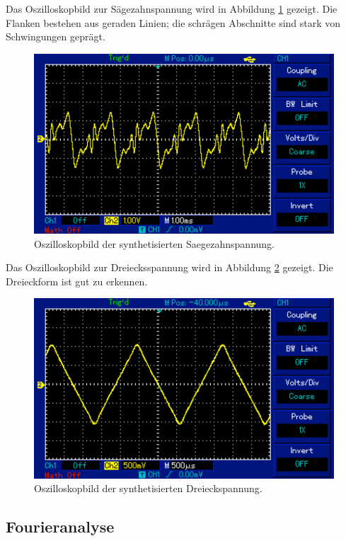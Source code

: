Das Oszilloskopbild zur Sägezahnspannung wird in Abbildung \ref{fig:oszsaeg}
gezeigt. Die Flanken bestehen aus geraden Linien; die schrägen Abschnitte
sind stark von Schwingungen geprägt.

\begin{figure}[h]
  \centering
  \includegraphics{oszsaeg.pdf}
  \caption{Oszilloskopbild der synthetisierten Saegezahnspannung.}
  \label{fig:oszsaeg}
\end{figure}

Das Oszilloskopbild zur Dreiecksspannung wird in Abbildung
\ref{fig:oszdrei} gezeigt. Die Dreieckform ist gut zu erkennen.

\begin{figure}[h]
  \centering
  \includegraphics{oszdrei.pdf}
  \caption{Oszilloskopbild der synthetisierten Dreieckspannung.}
  \label{fig:oszdrei}
\end{figure}

\FloatBarrier

\subsection{Fourieranalyse}

